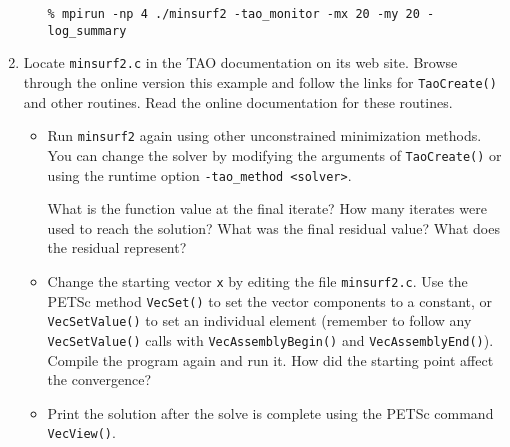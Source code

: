 \documentclass[11pt]{article}
\begin{document}
\begin{enumerate}
\begin{itemize}
\texttt{\% mpirun -np 4 ./minsurf2 -tao\_monitor -mx 20 -my 20 -log\_summary}

\end{itemize}

\item 
  Locate \texttt{minsurf2.c} in the TAO documentation on its web site.  Browse through
  the online version this example and follow the links for
  \texttt{TaoCreate()} and other routines.  Read the online documentation for these routines.

\begin{itemize}
  \item 
  Run \texttt{minsurf2} again using other unconstrained minimization 
  methods.    You can change the solver by modifying the arguments of 
  \texttt{TaoCreate()} or using the runtime option \texttt{-tao\_method <solver>}.
 
  What is the function value at the final iterate?
  How many iterates were used to reach
  the solution?  What was the final residual value? What does the residual represent?

 \item 
  Change the starting vector \texttt{x} by editing the file \texttt{minsurf2.c}.  
  Use the PETSc method {\tt VecSet()}
  to set the vector components to a constant, or {\tt VecSetValue()} to set 
  an individual element (remember to follow any {\tt VecSetValue()} calls
  with {\tt VecAssemblyBegin()} and {\tt VecAssemblyEnd()}).  Compile the program again and run it.
  How did the starting point affect the convergence?

 \item Print the solution after the solve is complete using the PETSc command {\tt VecView()}.
\end{itemize}

\end{enumerate}
\end{document}
